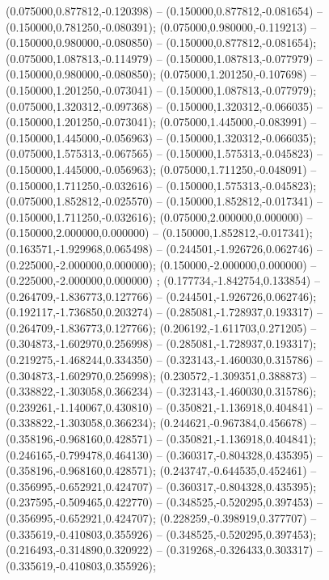  (0.075000,0.877812,-0.120398) -- (0.150000,0.877812,-0.081654) -- (0.150000,0.781250,-0.080391);
 (0.075000,0.980000,-0.119213) -- (0.150000,0.980000,-0.080850) -- (0.150000,0.877812,-0.081654);
 (0.075000,1.087813,-0.114979) -- (0.150000,1.087813,-0.077979) -- (0.150000,0.980000,-0.080850);
 (0.075000,1.201250,-0.107698) -- (0.150000,1.201250,-0.073041) -- (0.150000,1.087813,-0.077979);
 (0.075000,1.320312,-0.097368) -- (0.150000,1.320312,-0.066035) -- (0.150000,1.201250,-0.073041);
 (0.075000,1.445000,-0.083991) -- (0.150000,1.445000,-0.056963) -- (0.150000,1.320312,-0.066035);
 (0.075000,1.575313,-0.067565) -- (0.150000,1.575313,-0.045823) -- (0.150000,1.445000,-0.056963);
 (0.075000,1.711250,-0.048091) -- (0.150000,1.711250,-0.032616) -- (0.150000,1.575313,-0.045823);
 (0.075000,1.852812,-0.025570) -- (0.150000,1.852812,-0.017341) -- (0.150000,1.711250,-0.032616);
 (0.075000,2.000000,0.000000) -- (0.150000,2.000000,0.000000) -- (0.150000,1.852812,-0.017341);
 (0.163571,-1.929968,0.065498) -- (0.244501,-1.926726,0.062746) -- (0.225000,-2.000000,0.000000);
 (0.150000,-2.000000,0.000000) -- (0.225000,-2.000000,0.000000) ;
 (0.177734,-1.842754,0.133854) -- (0.264709,-1.836773,0.127766) -- (0.244501,-1.926726,0.062746);
 (0.192117,-1.736850,0.203274) -- (0.285081,-1.728937,0.193317) -- (0.264709,-1.836773,0.127766);
 (0.206192,-1.611703,0.271205) -- (0.304873,-1.602970,0.256998) -- (0.285081,-1.728937,0.193317);
 (0.219275,-1.468244,0.334350) -- (0.323143,-1.460030,0.315786) -- (0.304873,-1.602970,0.256998);
 (0.230572,-1.309351,0.388873) -- (0.338822,-1.303058,0.366234) -- (0.323143,-1.460030,0.315786);
 (0.239261,-1.140067,0.430810) -- (0.350821,-1.136918,0.404841) -- (0.338822,-1.303058,0.366234);
 (0.244621,-0.967384,0.456678) -- (0.358196,-0.968160,0.428571) -- (0.350821,-1.136918,0.404841);
 (0.246165,-0.799478,0.464130) -- (0.360317,-0.804328,0.435395) -- (0.358196,-0.968160,0.428571);
 (0.243747,-0.644535,0.452461) -- (0.356995,-0.652921,0.424707) -- (0.360317,-0.804328,0.435395);
 (0.237595,-0.509465,0.422770) -- (0.348525,-0.520295,0.397453) -- (0.356995,-0.652921,0.424707);
 (0.228259,-0.398919,0.377707) -- (0.335619,-0.410803,0.355926) -- (0.348525,-0.520295,0.397453);
 (0.216493,-0.314890,0.320922) -- (0.319268,-0.326433,0.303317) -- (0.335619,-0.410803,0.355926);
